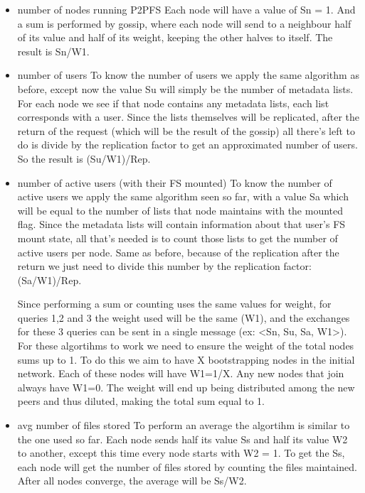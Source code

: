 \documentclass[times,9pt,article]{llncs}
\begin{document}
\begin{itemize}

\item number of nodes running P2PFS
Each node will have a value of Sn = 1. And a sum is performed by gossip, where each 
node will send to a neighbour half of its value and half of its weight, keeping the 
other halves to itself. The result is Sn/W1.

\item number of users
To know the number of users we apply the same algorithm as before, except now 
the value Su will simply be the number of metadata lists. For each node we see if
that node contains any metadata lists, each list corresponds with a user. Since 
the lists themselves will be replicated, after the return of the request (which will
be the result of the gossip) all there's left to do is divide by the replication 
factor to get an approximated number of users. So the result is (Su/W1)/Rep.

\item number of active users (with their FS mounted)
To know the number of active users we apply the same algorithm seen so far, with a
value Sa which will be equal to the number of lists that node maintains with the
mounted flag. Since the metadata lists will contain information about that user's
FS mount state, all that's needed is to count those lists to get the number of
active users per node. Same as before, because of the replication after the return
we just need to divide this number by the replication factor: (Sa/W1)/Rep.

Since performing a sum or counting uses the same values for weight, for queries 1,2 
and 3 the weight used will be the same (W1), and the exchanges for these 3 queries 
can be sent in a single message (ex: <Sn, Su, Sa, W1>). For these algortihms to work 
we need to ensure the weight of the total nodes sums up to 1. To do this we aim to
have X bootstrapping nodes in the initial network. Each of these nodes will have 
W1=1/X. 
Any new nodes that join always have W1=0. The weight will end up being distributed 
among the new peers and thus diluted, making the total sum equal to 1.

\item avg number of files stored
To perform an average the algortihm is similar to the one used so far. Each node
sends half its value Ss and half its value W2 to another, except this time every 
node starts with W2 = 1. To get the Ss, each node will get the number of files 
stored by counting the files maintained. After all nodes converge, the average will
be Ss/W2.


\end{itemize}
\end{document}
